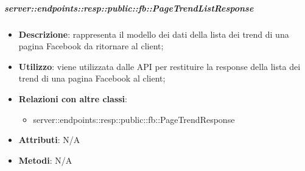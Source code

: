     \subparagraph{server::endpoints::resp::public::fb::PageTrendListResponse} %
    \label{subp:bdsm_app_server_endpoints_resp_public_fb_pagetrendlistresponse}
    \begin{itemize}
      \item \textbf{Descrizione}: rappresenta il modello dei dati della lista dei trend di una pagina Facebook da ritornare al client;
      \item \textbf{Utilizzo}: viene utilizzata dalle API per restituire la response della lista dei trend di una pagina Facebook al client;
      \item \textbf{Relazioni con altre classi}:
        \begin{itemize}
          \item server::endpoints::resp::public::fb::PageTrendResponse
        \end{itemize}
	  \item \textbf{Attributi}: N/A
	  \item \textbf{Metodi}: N/A
      \end{itemize}

